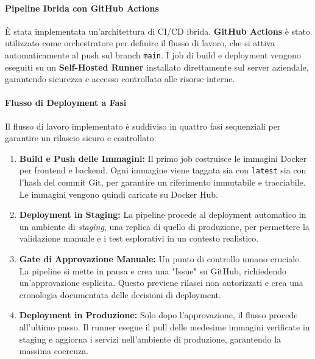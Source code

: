 \documentclass[12pt,a4paper,openright,twoside]{book}
\begin{document}
\paragraph{Pipeline Ibrida con GitHub Actions}
È stata implementata un'architettura di CI/CD ibrida. \textbf{GitHub Actions} è stato utilizzato come orchestratore per definire il flusso di lavoro, che si attiva automaticamente al push sul branch \texttt{main}. I job di build e deployment vengono eseguiti su un \textbf{Self-Hosted Runner} installato direttamente sul server aziendale, garantendo sicurezza e accesso controllato alle risorse interne.

\paragraph{Flusso di Deployment a Fasi}
Il flusso di lavoro implementato è suddiviso in quattro fasi sequenziali per garantire un rilascio sicuro e controllato:
\begin{enumerate}
    \item \textbf{Build e Push delle Immagini:} Il primo job costruisce le immagini Docker per frontend e backend. Ogni immagine viene taggata sia con \texttt{latest} sia con l'hash del commit Git, per garantire un riferimento immutabile e tracciabile. Le immagini vengono quindi caricate su Docker Hub.

    \item \textbf{Deployment in Staging:} La pipeline procede al deployment automatico in un ambiente di \textit{staging}, una replica di quello di produzione, per permettere la validazione manuale e i test esplorativi in un contesto realistico.

    \item \textbf{Gate di Approvazione Manuale:} Un punto di controllo umano cruciale. La pipeline si mette in pausa e crea una "Issue" su GitHub, richiedendo un'approvazione esplicita. Questo previene rilasci non autorizzati e crea una cronologia documentata delle decisioni di deployment.

    \item \textbf{Deployment in Produzione:} Solo dopo l'approvazione, il flusso procede all'ultimo passo. Il runner esegue il pull delle medesime immagini verificate in staging e aggiorna i servizi nell'ambiente di produzione, garantendo la massima coerenza.
\end{enumerate}
\end{document}
